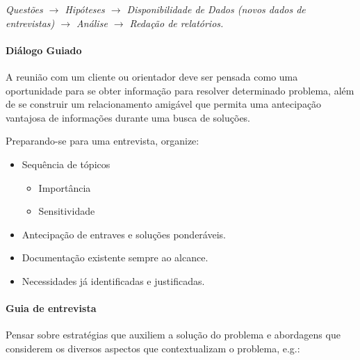 \emph{Questões $\to$ Hipóteses $\to$ Disponibilidade de Dados (novos dados de
	entrevistas) $\to$  Análise $\to$ Redação de relatórios.}

\paragraph{Diálogo Guiado}

A reunião com um cliente ou orientador deve ser pensada como uma oportunidade para se obter informação para resolver determinado problema, além de se construir um relacionamento amigável que permita uma antecipação vantajosa de informações durante uma busca de soluções.

Preparando-se para uma entrevista, organize:
\begin{itemize}
	\item Sequência de tópicos
	\begin{itemize}
		\item Importância
		\item Sensitividade
	\end{itemize}
	\item Antecipação
	de entraves e soluções ponderáveis.
	\item Documentação
	existente sempre ao alcance.
	\item Necessidades
	já identificadas e justificadas.
\end{itemize}


\paragraph{Guia de entrevista} Pensar sobre estratégias que auxiliem a solução do problema e abordagens que considerem os diversos aspectos que contextualizam o problema, e.g.: 

